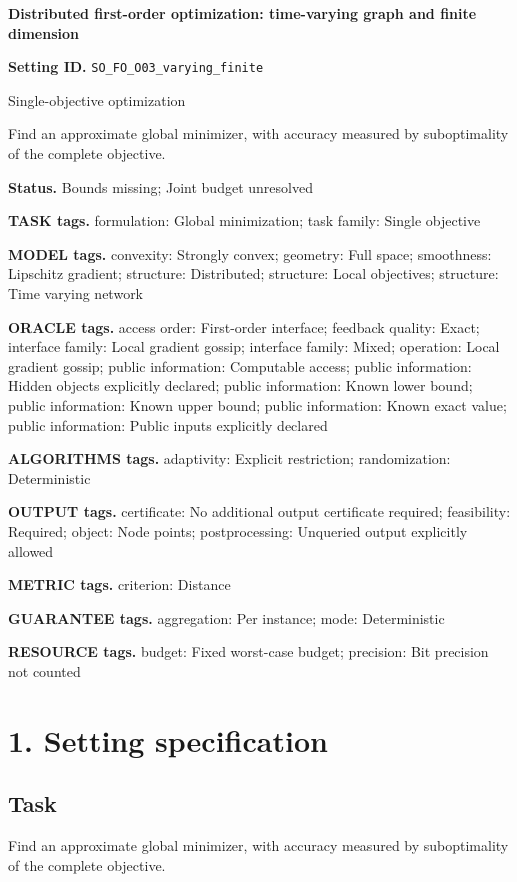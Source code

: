 \documentclass[10pt,a4paper]{article}
\begin{document}
\raggedright

{\LARGE\bfseries\sffamily\color{AtlasNavy} Distributed first-order optimization: time-varying graph and finite dimension\par}\vspace{5pt}
\textbf{Setting ID.} \texttt{SO\_\allowbreak{}FO\_\allowbreak{}O03\_\allowbreak{}varying\_\allowbreak{}finite}

Single-objective optimization

Find an approximate global minimizer, with accuracy measured by suboptimality of the complete objective.

\textbf{Status.} Bounds missing; Joint budget unresolved

\textbf{TASK tags.} formulation: Global minimization; task family: Single objective

\textbf{MODEL tags.} convexity: Strongly convex; geometry: Full space; smoothness: Lipschitz gradient; structure: Distributed; structure: Local objectives; structure: Time varying network

\textbf{ORACLE tags.} access order: First-order interface; feedback quality: Exact; interface family: Local gradient gossip; interface family: Mixed; operation: Local gradient gossip; public information: Computable access; public information: Hidden objects explicitly declared; public information: Known lower bound; public information: Known upper bound; public information: Known exact value; public information: Public inputs explicitly declared

\textbf{ALGORITHMS tags.} adaptivity: Explicit restriction; randomization: Deterministic

\textbf{OUTPUT tags.} certificate: No additional output certificate required; feasibility: Required; object: Node points; postprocessing: Unqueried output explicitly allowed

\textbf{METRIC tags.} criterion: Distance

\textbf{GUARANTEE tags.} aggregation: Per instance; mode: Deterministic

\textbf{RESOURCE tags.} budget: Fixed worst-case budget; precision: Bit precision not counted

\section{1. Setting specification}
\subsection{Task}
Find an approximate global minimizer, with accuracy measured by suboptimality of the complete objective.
\end{document}

